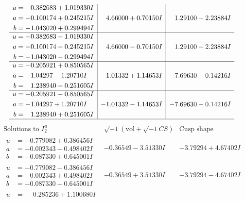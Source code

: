 \documentclass[1p]{elsarticle_modified}
\theoremstyle{definition}
\newcommand{\I}{\sqrt{-1}}
\begin{document}
$$\begin{array}{c|c|c}
\begin{aligned}
u &= -0.382683 + 1.019330 I \\
a &= -0.100174 + 0.245215 I \\
b &= -1.043020 + 0.299494 I\end{aligned}
 & \phantom{-}4.66000 + 0.70150 I & \phantom{-}1.29100 - 2.23884 I \\ \hline\begin{aligned}
u &= -0.382683 - 1.019330 I \\
a &= -0.100174 - 0.245215 I \\
b &= -1.043020 - 0.299494 I\end{aligned}
 & \phantom{-}4.66000 - 0.70150 I & \phantom{-}1.29100 + 2.23884 I \\ \hline\begin{aligned}
u &= -0.205921 + 0.850565 I \\
a &= -1.04297 - 1.20710 I \\
b &= \phantom{-}1.238940 - 0.251605 I\end{aligned}
 & -1.01332 + 1.14653 I & -7.69630 + 0.14216 I \\ \hline\begin{aligned}
u &= -0.205921 - 0.850565 I \\
a &= -1.04297 + 1.20710 I \\
b &= \phantom{-}1.238940 + 0.251605 I\end{aligned}
 & -1.01332 - 1.14653 I & -7.69630 - 0.14216 I\\
 \hline 
 \end{array}$$\newpage$$\begin{array}{c|c|c}  
\text{Solutions to }I^u_{2}& \I (\text{vol} + \sqrt{-1}CS) & \text{Cusp shape}\\
 \hline 
\begin{aligned}
u &= -0.779082 + 0.386456 I \\
a &= -0.002343 - 0.498402 I \\
b &= -0.087330 + 0.645001 I\end{aligned}
 & -0.36549 - 3.51330 I & -3.79294 + 4.67402 I \\ \hline\begin{aligned}
u &= -0.779082 - 0.386456 I \\
a &= -0.002343 + 0.498402 I \\
b &= -0.087330 - 0.645001 I\end{aligned}
 & -0.36549 + 3.51330 I & -3.79294 - 4.67402 I \\ \hline\begin{aligned}
u &= \phantom{-}0.285236 + 1.100680 I \\

\end{aligned}
\end{array}$$
\end{document}
